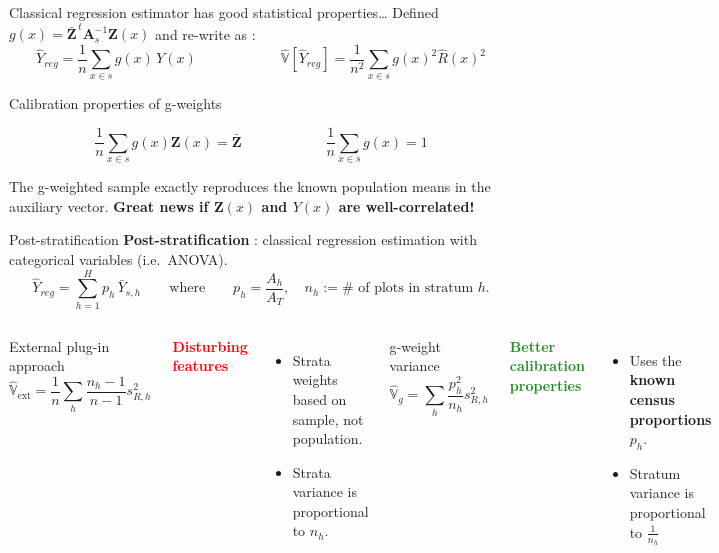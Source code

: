 \documentclass[
  ignorenonframetext,
  aspectratio=169,
]{beamer}
\begin{document}
\begin{frame}{Classical regression estimator has good statistical
properties\ldots{}}
\label{classical-regression-estimator-has-good-statistical-properties}
Defined \(g(x)=\bar{\mathbf Z}^{\,t}\mathbf A_s^{-1}\mathbf Z(x)\) and
re-write as : \[
\boxed{
\hat{Y}_{reg}
=
\frac{1}{n}\sum_{x\in s} g(x)\,Y(x)
}
\qquad\qquad\qquad
\boxed{
\hat{\mathbb V}[\hat{Y}_{reg}]
=
\frac{1}{n^2}
\sum_{x\in s}g(x)^2\hat R(x)^2
}
\]

\begin{block}{Calibration properties of g-weights}

$$
\frac{1}{n}\sum_{x\in s}g(x)\mathbf Z(x)
=
\bar{\mathbf Z}
\qquad\qquad\qquad
\frac{1}{n}\sum_{x\in s}g(x)=1
$$
\end{block}

\centering

The g-weighted sample exactly reproduces the known population means in
the auxiliary vector. \newline\newline  \pause \textbf{Great news if
\(\mathbf Z(x)\) and \(Y(x)\) are well-correlated!}
\end{frame}

\begin{frame}{Post-stratification}
\label{post-stratification}
\textbf{Post-stratification} : classical regression estimation with
categorical variables (i.e.~ANOVA). \vspace{-.15em} \[
\boxed{
\hat Y_{reg}
=
\sum_{h=1}^H p_h\,\bar Y_{s,h}
}
\qquad
\text{where}
\qquad
p_h=\frac{A_h}{A_T},
\quad
n_h := \#\text{ of plots in stratum } h.
\]

\begin{columns}[T]

\begin{block}{External plug-in approach}
\[
\widehat{\mathbb V}_{\mathrm{ext}}
=
\frac{1}{n}
\sum_h
\frac{n_h-1}{n-1}s_{R,h}^2
\]
\end{block}
\centering
\textcolor{red}{\textbf{Disturbing features}}

\begin{itemize}
\item Strata weights based on sample, not population.
\item Strata variance is proportional to $n_h$.
\end{itemize}

\begin{block}{g-weight variance}
\[
\widehat{\mathbb V}_{g}
=
\sum_h
\frac{p_h^2}{n_h}s_{R,h}^2
\]
\end{block}
\centering
\textcolor{ForestGreen}{\textbf{Better calibration properties}}

\begin{itemize}
\item Uses the \textbf{known census proportions} $p_h$.
\item Stratum variance is proportional to $\frac{1}{n_h}$
\end{itemize}

\end{columns}
\end{frame}
\end{document}
